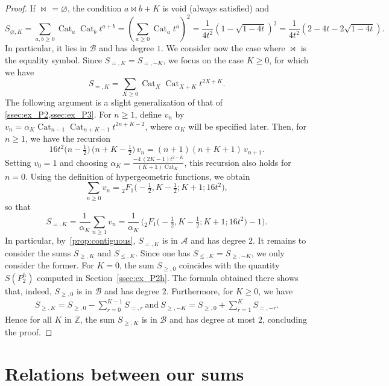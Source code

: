\documentclass[12pt]{amsart}
\theoremstyle{plain}
\theoremstyle{remark}
\def\Z{\mathbb{Z}}
\DeclareMathOperator{\Cat}{Cat}
\def\cA{\mathcal{A}}
\def\cB{\mathcal{B}}
\begin{document}
\begin{proof}
If $\bowtie \, = \varnothing$, the condition $a \bowtie b+K$ is void (always satisfied) and
\[S_{\varnothing,K} = \sum_{a, b \geq 0} \Cat_a \Cat_b t^{a+b} = 
\left( \sum_{a \geq 0} \Cat_a t^a\right)^2=  \frac{1}{4 t^2}\left( 1-\sqrt{1-4t} \right)^2=\frac{1}{4 t^2}\left(2-4t -2\sqrt{1-4t}\right).\]
In particular, it lies in $\cB$ and has degree $1$.
We consider now the case where $\bowtie$ is the equality symbol.
Since $S_{=,K} = S_{=,-K}$, we focus on the case $K \ge 0$,
for which we have
 \[S_{=,K}=\sum_{X \ge 0} \Cat_X \Cat_{X+K} t^{2X+K}.\]
The following argument is a slight generalization of that of \cref{ssec:ex_P2,ssec:ex_P3}.
For $n \ge 1$, define $v_n$ by $v_n= \alpha_K \Cat_{n-1} \Cat_{n+K-1} t^{2n+K-2}$, where
$\alpha_K$ will be specified later.
Then, for $n \ge 1$, we have the recursion 
\[16 t^2\big(n-\tfrac12\big)\, \big(n+K-\tfrac12\big) \, v_n = (n+1)(n+K+1) \, v_{n+1}.\]
Setting $v_0=1$ and choosing $\alpha_K= \frac{-4\, (2K-1) t^{2-K}}{(K+1) \Cat_K}$, this recursion also holds for $n=0$.
Using the definition of hypergeometric functions, we obtain
\[\sum_{ n \ge 0} v_n = {}_{2}^{}{{}{{}{F_{1}^{}}}}\big(-\tfrac12,K-\tfrac12; K+1;16t^2\big), \]
so that
\[
S_{=,K}  = \frac{1}{\alpha_K} \sum_{n \ge 1} v_n
= \frac{1}{\alpha_K} \, \Big({}_{2}^{}{{}{{}{F_{1}^{}}}}\big(-\tfrac12,K-\tfrac12; K+1;16t^2\big) -1 \Big).
\]
In particular, by~\cref{prop:contiguous}, $S_{=,K}$ is in $\cA$ and has degree $2$. It remains to consider the sums $S_{\ge,K}$ and $S_{\le,K}$. Since one has $S_{\le,K}=S_{\ge,-K}$, we only consider the former. For $K=0$, the sum  $S_{\ge,0}$ coincides with the quantity $S(P_2^h)$ computed in Section~\ref{ssec:ex_P2h}. The formula obtained there shows that, indeed,
$S_{\ge,0}$ is in $\cB$ and has degree $2$.
Furthermore, for $K \geq 0$, we have
\begin{align*}
S_{\ge,K} = S_{\ge,0}-\sum_{r=0}^{K-1} S_{=,r}  \ \text{and}\ S_{\ge,-K} = S_{\ge,0}+\sum_{r=1}^{K} S_{=,-r}.
\end{align*}
Hence for all $K$ in $\Z$, the sum $S_{\ge,K}$ is in $\cB$ and has degree at most $2$, concluding the proof.
\end{proof}


\section{Relations between our sums}
\label{sec:relations}
\end{document}
